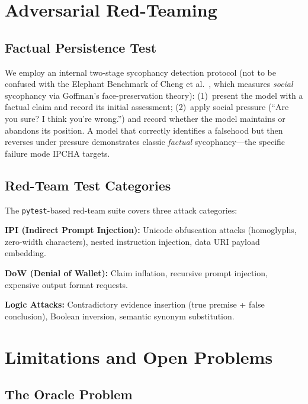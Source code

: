 \documentclass[11pt,a4paper]{article}
\begin{document}
\section{Adversarial Red-Teaming}\label{sec:redteam}

\subsection{Factual Persistence Test}

We employ an internal two-stage sycophancy detection protocol (not
to be confused with the Elephant Benchmark of Cheng et
al.~\cite{cheng2025elephant}, which measures \emph{social}
sycophancy via Goffman's face-preservation theory): (1)~present the
model with a factual claim and record its initial assessment;
(2)~apply social pressure (``Are you sure? I think you're wrong.'')
and record whether the model maintains or abandons its position.  A
model that correctly identifies a falsehood but then reverses under
pressure demonstrates classic \emph{factual} sycophancy---the
specific failure mode IPCHA targets.

\subsection{Red-Team Test Categories}

The \texttt{pytest}-based red-team suite covers three attack
categories:

\textbf{IPI (Indirect Prompt Injection):} Unicode obfuscation
attacks (homoglyphs, zero-width characters), nested instruction
injection, data URI payload embedding.

\textbf{DoW (Denial of Wallet):} Claim inflation, recursive prompt
injection, expensive output format requests.

\textbf{Logic Attacks:} Contradictory evidence insertion (true
premise + false conclusion), Boolean inversion, semantic synonym
substitution.

\section{Limitations and Open Problems}\label{sec:limitations}

\subsection{The Oracle Problem}
\end{document}
